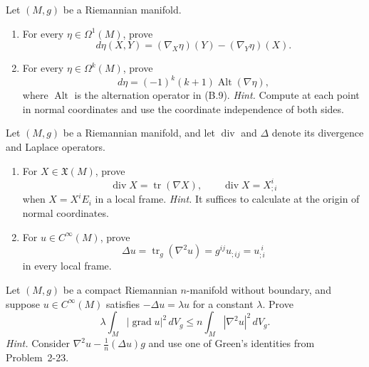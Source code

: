 \begin{exercise}
\label{prob:exterior-derivative-covariant-formula}

Let $(M,g)$ be a Riemannian manifold.
\begin{enumerate}
\item[(a)] For every $\eta\in\Omega^1(M)$, prove
\[
d\eta(X,Y)=(\nabla_X\eta)(Y)-(\nabla_Y\eta)(X).
\]
\item[(b)] For every $\eta\in\Omega^k(M)$, prove
\[
d\eta=(-1)^k(k+1)\operatorname{Alt}(\nabla\eta),
\]
where $\operatorname{Alt}$ is the alternation operator in (B.9).
\emph{Hint.} Compute at each point in normal coordinates and use the
coordinate independence of both sides.
\end{enumerate}
\end{exercise}

\begin{exercise}
\label{prob:divergence-laplacian-formulas}

Let $(M,g)$ be a Riemannian manifold, and let $\operatorname{div}$ and
$\Delta$ denote its divergence and Laplace operators.
\begin{enumerate}
\item[(a)] For $X\in\mathfrak X(M)$, prove
\[
\operatorname{div}X=\operatorname{tr}(\nabla X),
\qquad
\operatorname{div}X=X^i_{;i}
\]
when $X=X^iE_i$ in a local frame. \emph{Hint.} It suffices to calculate at
the origin of normal coordinates.
\item[(b)] For $u\in C^\infty(M)$, prove
\[
\Delta u=\operatorname{tr}_g(\nabla^2u)
=g^{ij}u_{;ij}=u_{;i}^{\ i}
\]
in every local frame.
\end{enumerate}
\end{exercise}

\begin{exercise}
\label{prob:eigenfunction-laplacian-inequality}

Let $(M,g)$ be a compact Riemannian $n$-manifold without boundary, and suppose
$u\in C^\infty(M)$ satisfies $-\Delta u=\lambda u$ for a constant $\lambda$.
Prove
\[
\lambda\int_M|\operatorname{grad}u|^2\,dV_g
\leq n\int_M|\nabla^2u|^2\,dV_g.
\]
\emph{Hint.} Consider $\nabla^2u-\frac1n(\Delta u)g$ and use one of Green's
identities from Problem~2-23.
\end{exercise}

